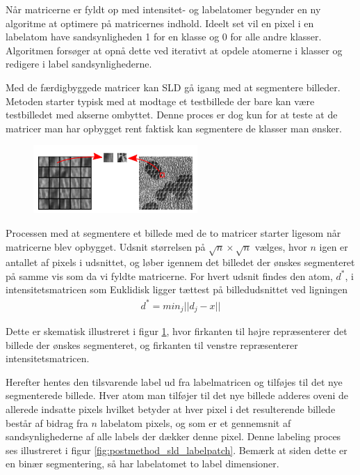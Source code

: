 Når matricerne er fyldt op med intensitet- og labelatomer begynder en ny algoritme at optimere på matricernes indhold. Ideelt set vil en pixel i en labelatom have sandsynligheden 1 for en klasse og 0 for alle andre klasser. Algoritmen forsøger at opnå dette ved iterativt at opdele atomerne i klasser og redigere i label sandsynlighederne. 

Med de færdigbyggede matricer kan SLD gå igang med at segmentere billeder. Metoden starter typisk med at modtage et testbillede der bare kan være testbilledet med akserne ombyttet. Denne proces er dog kun for at teste at de matricer man har opbygget rent faktisk kan segmentere de klasser man ønsker.

\begin{figure}[H]
		\centering
		\includegraphics[scale=1]{files/postmethod/img/dict_3.png}
	\caption{\label{fig:postmethod_sld_imagepatch}}
\end{figure}

Processen med at segmentere et billede med de to matricer starter ligesom når matricerne blev opbygget. Udsnit størrelsen på $\sqrt{n}\times\sqrt{n}$ vælges, hvor $n$ igen er antallet af pixels i udsnittet, og løber igennem det billedet der ønskes segmenteret på samme vis som da vi fyldte matricerne. For hvert udsnit findes den atom, $d^*$, i intensitetsmatricen som Euklidisk ligger tættest på billedudsnittet ved ligningen
\begin{align}
	d^* = min_j ||d_j-x||
\end{align}

Dette er skematisk illustreret i figur \ref{fig:postmethod_sld_imagepatch}, hvor firkanten til højre repræsenterer det billede der ønskes segmenteret, og firkanten til venstre repræsenterer intensitetsmatricen. 

Herefter hentes den tilsvarende label ud fra labelmatricen og tilføjes til det nye segmenterede billede. Hver atom man tilføjer til det nye billede adderes oveni de allerede indsatte pixels hvilket betyder at hver pixel i det resulterende billede består af bidrag fra $n$ labelatom pixels, og som er et gennemsnit af sandsynlighederne af alle labels der dækker denne pixel. Denne labeling proces ses illustreret i figur \ref{fig:postmethod_sld_labelpatch}. Bemærk at siden dette er en binær segmentering, så har labelatomet to label dimensioner.  

